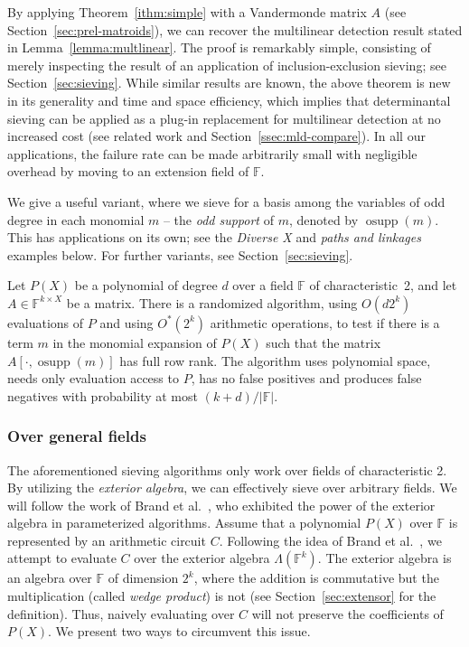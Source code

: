 \documentclass{theoretics}
\newcommand{\F}{\ensuremath{\mathbb F}\xspace}
\DeclareMathOperator{\osupp}{osupp}
\begin{document}
By applying Theorem~\ref{ithm:simple} with a Vandermonde matrix $A$ (see Section~\ref{sec:prel-matroids}), we can recover the multilinear detection result stated in Lemma~\ref{lemma:multlinear}.
The proof is remarkably simple, consisting of merely inspecting the
result of an application of inclusion-exclusion sieving; see Section~\ref{sec:sieving}. 
While similar results are known, the above theorem is new in its
generality and time and space efficiency, which implies that
determinantal sieving can be applied as a plug-in replacement 
for multilinear detection at no increased cost (see related work
and Section~\ref{ssec:mld-compare}).
In all our applications, the failure rate can be made
arbitrarily small with negligible overhead by moving to an extension field of $\F$.

We give a useful variant, where we sieve for a basis among the variables
of odd degree in each monomial $m$  -- the \emph{odd support} of $m$, denoted by $\osupp(m)$.
This has applications on its own; see the
\emph{Diverse X} and \emph{paths and linkages} examples below.
For further variants,
see Section~\ref{sec:sieving}.


\begin{theorem} \label{ithm:odd-sieve}
  Let $P(X)$
  be a polynomial of degree $d$ over a field $\F$ of characteristic~2, 
  and let $A \in \F^{k \times X}$ be a
  matrix. There is a randomized algorithm,
  using $O(d2^k)$ evaluations of $P$ and using $O^*(2^k)$ arithmetic operations, to test if there is a 
  term $m$ in the monomial expansion of $P(X)$ such that the 
  matrix $A[\cdot, \osupp(m)]$ has full row rank.
  The algorithm uses polynomial space, needs only evaluation access to $P$,
  has no false positives and produces false negatives with probability
  at most $(k+d)/|\F|$.
\end{theorem}

\subsubsection{Over general fields}

The aforementioned sieving algorithms only work over fields of characteristic 2.
By utilizing the \emph{exterior algebra}, we can effectively sieve over arbitrary fields.
We will follow the work of Brand et al.~\cite{BrandDH18}, who exhibited the power of the exterior algebra in parameterized algorithms.
Assume that a polynomial $P(X)$ over $\F$ is represented by an arithmetic circuit $C$.
Following the idea of Brand et al.~\cite{BrandDH18}, we attempt to evaluate $C$ over the exterior algebra $\Lambda(\F^k)$.
The exterior algebra is an algebra over $\F$ of dimension $2^k$, where
the addition is commutative but the multiplication (called \emph{wedge product}) is not (see Section~\ref{sec:extensor} for the definition).
Thus, naively evaluating over $C$ will not preserve the coefficients of $P(X)$.
We present two ways to circumvent this issue.
\end{document}
